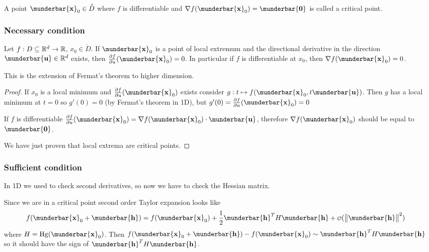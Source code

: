 \documentclass[14pt]{extarticle}
\renewcommand{\vec}[1]{\munderbar{\mathbf{#1}}}
\newcommand{\Hg}{{\operatorfont Hg}}
\begin{document}
\begin{definition}
    A point $\vec x_0 \in \mathring{D}$ where $f$ is differentiable and $\nabla f(\vec x_0)= \vec 0$ is called a critical point.
\end{definition}

\subsubsection{Necessary condition}

\begin{proposition}
    Let $f: D\subseteq \mathbb{R}^d \to \mathbb{R}$, $x_0 \in \mathring{D}$.
    If $\vec x_0$ is a point of local extremum and the directional derivative in the direction $\vec u \in \R^d$ exists, then $\pdv{f}{u}()(\vec x_0) = 0$.
    In particular if $f$ is differentiable at $x_0$, then $\nabla f(\vec x_0) = 0$.
\end{proposition}

\begin{remark}
    This is the extension of Fermat's theorem to higher dimension.
\end{remark}

\begin{proof}
    If $x_0$ is a local minimum and $\pdv{f}{u}()(\vec x_0)$ exists consider $g: t \mapsto f(\vec x_0, t \vec u)$.
    Then $g$ has a local minimum at $t = 0$ so $g'(0) = 0$ (by Fermat's theorem in 1D),
    but $g'(0) = \pdv{f}{u}()(\vec x_0) = 0$

    If $f$ is differentiable $\pdv{f}{u}()(\vec x_0) = \nabla f (\vec x_0) \cdot \vec u$, therefore $\nabla f(\vec x_0)$ should be equal to $\vec 0$.

    We have just proven that local extrema are critical points.
\end{proof}

\subsubsection{Sufficient condition}

In 1D we used to check second derivatives, so now we have to check the Hessian matrix.

Since we are in a critical point second order Taylor expansion looks like
\begin{equation}
    f(\vec x_0 + \vec h) = f(\vec x_0) + \frac{1}{2} \vec h^T H \vec h + \o(\norm{\vec h}^2)
\end{equation}
where $H = \Hg(\vec x_0)$.
Then $f(\vec x_0 + \vec h) - f(\vec x_0) \sim \vec h^T H \vec h$ so it should have the sign of $\vec h^T H \vec h$.
\end{document}
